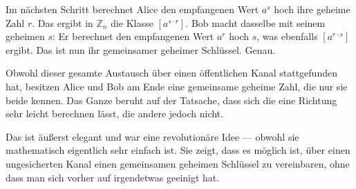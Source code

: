 \begin{spoken-clean}[00:22:40 - 00:25:21]
Im nächsten Schritt berechnet Alice den empfangenen Wert $a^s$ hoch ihre geheime Zahl $r$. Das ergibt in $\mathbb{Z}_n$ die Klasse $[a^{s \cdot r}]$. Bob macht dasselbe mit seinem geheimen $s$: Er berechnet den empfangenen Wert $a^r$ hoch $s$, was ebenfalls $[a^{r \cdot s}]$ ergibt. Das ist nun ihr gemeinsamer geheimer Schlüssel. Genau.

Obwohl dieser gesamte Austausch über einen öffentlichen Kanal stattgefunden hat, besitzen Alice und Bob am Ende eine gemeinsame geheime Zahl, die nur sie beide kennen. Das Ganze beruht auf der Tatsache, dass sich die eine Richtung sehr leicht berechnen lässt, die andere jedoch nicht.

Das ist äußerst elegant und war eine revolutionäre Idee --- obwohl sie mathematisch eigentlich sehr einfach ist. Sie zeigt, dass es möglich ist, über einen ungesicherten Kanal einen gemeinsamen geheimen Schlüssel zu vereinbaren, ohne dass man sich vorher auf irgendetwas geeinigt hat.
\end{spoken-clean}

